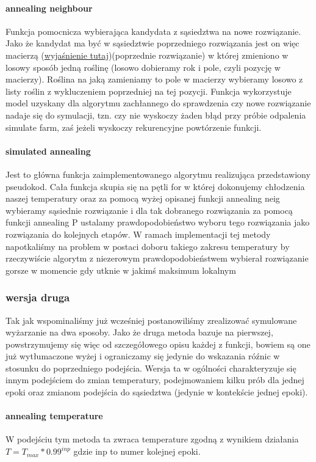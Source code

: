 \documentclass{article}
\begin{document}
\paragraph{annealing neighbour}
Funkcja pomocnicza wybierająca kandydata z sąsiedztwa na nowe rozwiązanie. Jako że kandydat ma być w sąsiedztwie poprzedniego rozwiązania jest on więc macierzą (\hyperref[postac_rozw]{wyjaśnienie tutaj})(poprzednie rozwiązanie) w której zmieniono w losowy sposób jedną roślinę (losowo dobieramy rok i pole, czyli pozycję w macierzy). Roślina na jaką zamieniamy to pole w macierzy wybieramy losowo z listy roślin z wykluczeniem poprzedniej na tej pozycji.
Funkcja wykorzystuje model uzyskany dla algorytmu zachłannego do sprawdzenia czy nowe rozwiązanie nadaje się do symulacji, tzn. czy nie wyskoczy żaden błąd przy próbie odpalenia simulate farm, zaś jeżeli wyskoczy rekurencyjne powtórzenie funkcji.

\paragraph{simulated annealing}
Jest to główna funkcja zaimplementowanego algorytmu realizująca przedstawiony pseudokod. Cała funkcja skupia się na pętli for w której dokonujemy chłodzenia naszej temperatury oraz za pomocą wyżej opisanej funkcji annealing neig  wybieramy sąsiednie rozwiązanie i dla tak dobranego rozwiązania za pomocą funkcji annealing P ustalamy prawdopodobieństwo wyboru tego rozwiązania jako rozwiązania do kolejnych etapów. W ramach implementacji tej metody napotkaliśmy na problem w postaci doboru takiego zakresu temperatury by rzeczywiście algorytm z niezerowym prawdopodobieństwem wybierał rozwiązanie gorsze w momencie gdy utknie w jakimś maksimum lokalnym


\subsubsection{wersja druga}
Tak jak wspominaliśmy już wcześniej postanowiliśmy zrealizować symulowane wyżarzanie na dwa sposoby. Jako że druga metoda bazuje na pierwszej, powstrzymujemy się więc od szczegółowego opisu każdej z funkcji, bowiem są one już wytłumaczone wyżej i ograniczamy się jedynie do wskazania róźnic w stosunku do poprzedniego podejścia. Wersja ta w ogólności charakteryzuje się innym podejściem do zmian temperatury, podejmowaniem kilku prób dla jednej epoki oraz
zmianom podejścia do sąsiedztwa (jedynie w kontekście jednej epoki).

\paragraph{annealing temperature}
 W podejściu tym metoda ta zwraca temperature zgodną z wynikiem działania $T = T_{max} * 0.99^{inp}$ gdzie inp to numer kolejnej epoki.
\end{document}
